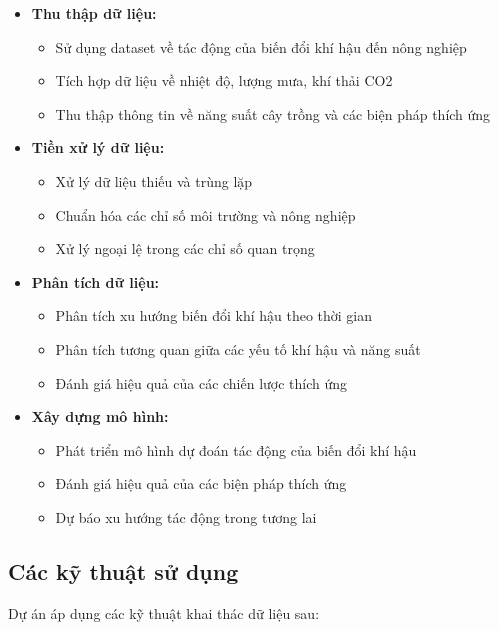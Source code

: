 \begin{itemize}
    \item \textbf{Thu thập dữ liệu:}
    \begin{itemize}
        \item Sử dụng dataset về tác động của biến đổi khí hậu đến nông nghiệp
        \item Tích hợp dữ liệu về nhiệt độ, lượng mưa, khí thải CO2
        \item Thu thập thông tin về năng suất cây trồng và các biện pháp thích ứng
    \end{itemize}
    
    \item \textbf{Tiền xử lý dữ liệu:}
    \begin{itemize}
        \item Xử lý dữ liệu thiếu và trùng lặp
        \item Chuẩn hóa các chỉ số môi trường và nông nghiệp
        \item Xử lý ngoại lệ trong các chỉ số quan trọng
    \end{itemize}
    
    \item \textbf{Phân tích dữ liệu:}
    \begin{itemize}
        \item Phân tích xu hướng biến đổi khí hậu theo thời gian
        \item Phân tích tương quan giữa các yếu tố khí hậu và năng suất
        \item Đánh giá hiệu quả của các chiến lược thích ứng
    \end{itemize}
    
    \item \textbf{Xây dựng mô hình:}
    \begin{itemize}
        \item Phát triển mô hình dự đoán tác động của biến đổi khí hậu
        \item Đánh giá hiệu quả của các biện pháp thích ứng
        \item Dự báo xu hướng tác động trong tương lai
    \end{itemize}
\end{itemize}

\subsection{Các kỹ thuật sử dụng}

\hspace{0.5cm}Dự án áp dụng các kỹ thuật khai thác dữ liệu sau:

